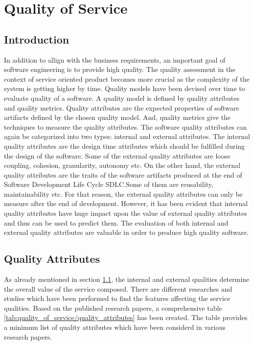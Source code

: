 \chapter{Quality of Service}\label{chapter:quality_of_service}
\section{Introduction}\label{section:quality_of_service/introduction}
In addition to allign with the business requirements, an important goal of software engineering is to provide high quality. The quality assessment in the context of service oriented product becomes more crucial as the complexity of the system is getting higher by time. \cite{Zhang:2009aa, Goeb:2011aa, Nematzadeh:2014aa} Quality models have been devised over time to evaluate quality of a software. A quality model is defined by quality attributes and quality metrics. Quality attributes are the expected properties of software artifacts defined by the chosen quality model. And, quality metrics give the techniques to measure the quality attributes. \cite{Mancioppi:2015aa} The software quality attributes can again be categorized into two types: internal and external attributes. \cite{Mancioppi:2015aa, Briand:1996aa} The internal quality attributes are the design time attributes which should be fulfilled during the design of the software. Some of the external quality attributes are loose coupling, cohesion, granularity, autonomy etc.\cite{Rostampour:2011aa, Sindhgatta:2015aa, Elhag:2014aa} On the other hand, the external quality attributes are the traits of the software artifacts produced at the end of Software Development Life Cycle \acrshort{SDLC}.Some of them are reusability, maintainability etc. \cite{Elhag:2014aa, Mancioppi:2015aa, Feuerlicht:2007aa, Feuerlicht:2013aa} For that reason, the external quality attributes can only be measure after the end of development. However, it has been evident that internal quality attributes have huge impact upon the value of external quality attributes and thus can be used to predict them. \cite{Henry:1990aa, Briand:2015aa, Alshayeb:2003aa, Bingu-Shim:2008aa}The evaluation of both internal and external quality attributes are valuable in order to produce high quality software.\cite{Mancioppi:2015aa, Perepletchikov:2007aa, Mikhail-Perepletchikov:2015aa}

\section{Quality Attributes}\label{section:quality_of_service/quality_attributes}
As already mentioned in section \ref{section:quality_of_service/introduction}, the internal and external qualities determine the overall value of the service composed. There are different researches and studies which have been performed to find the features affecting the service qualities. Based on the published research papers, a comprehensive table \ref{tab:quality_of_service/quality_attributes} has been created. The table provides a minimum list of quality attributes which have been considerd in various research papers. 

